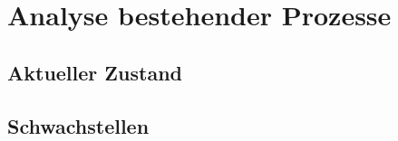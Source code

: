\section{Analyse bestehender Prozesse}\label{sec:analyse-bestehender-prozesse}
    \subsection{Aktueller Zustand}\label{subsec:aktueller-zustand}
    \subsection{Schwachstellen}\label{subsec:schwachstellen}